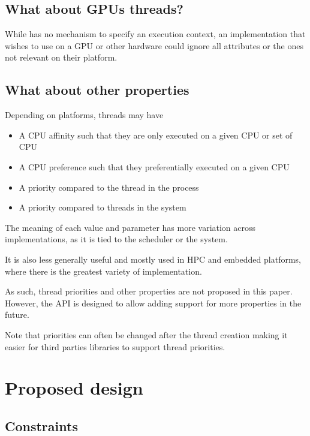 \documentclass{wg21}
\begin{document}
\subsection{What about GPUs threads?}

While  has no mechanism to specify an execution context, an implementation that wishes
to use  on a GPU or other hardware could ignore all attributes or the ones not relevant on their platform.

\subsection{What about other properties}

Depending on platforms, threads may have

\begin{itemize}
\item A CPU affinity such that they are only executed on a given CPU or set of CPU
\item A CPU preference such that they preferentially executed on a given CPU
\item A priority compared to the thread in the process
\item A priority compared to threads in the system
\end{itemize}

The meaning of each value and parameter has more variation across implementations,
as it is tied to the scheduler or the system.

It is also less generally useful and mostly used in HPC and embedded platforms, where there is the greatest variety of implementation. 

As such, thread priorities and other properties are not proposed in this paper.
However, the API is designed to allow adding support for more properties in the future.

Note that priorities can often be changed after the thread creation making it easier for third
parties libraries to support thread priorities.


\section{Proposed design}

\subsection{Constraints}
\end{document}
